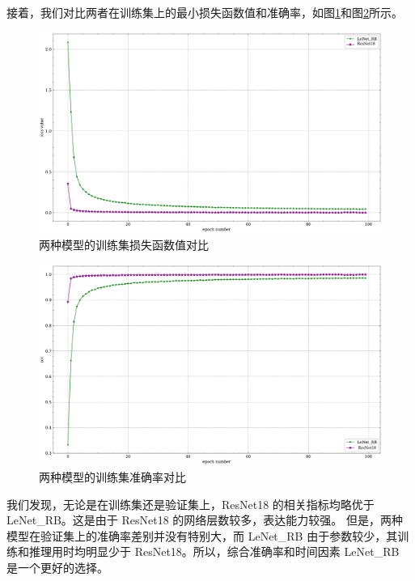 \documentclass[supercite]{Experimental_Report}
\theoremstyle{definition}
\begin{document}
接着，我们对比两者在训练集上的最小损失函数值和准确率，如图\ref{损失函数对比}和图\ref{准确率对比}所示。
\begin{figure}[H]
	\begin{center}
		\includegraphics[scale=0.45]{../images/模型对比loss.pdf}
		\caption{两种模型的训练集损失函数值对比}
		\label{损失函数对比}
	\end{center}
\end{figure}
\begin{figure}[H]
	\begin{center}
		\includegraphics[scale=0.45]{../images/模型对比acc.pdf}
		\caption{两种模型的训练集准确率对比}
		\label{准确率对比}
	\end{center}
\end{figure}
  
我们发现，无论是在训练集还是验证集上，ResNet18 的相关指标均略优于 LeNet\_RB。这是由于 ResNet18 的网络层数较多，表达能力较强。
但是，两种模型在验证集上的准确率差别并没有特别大，而 LeNet\_RB 由于参数较少，其训练和推理用时均明显少于 ResNet18。所以，综合准确率和时间因素
LeNet\_RB 是一个更好的选择。
\end{document}
